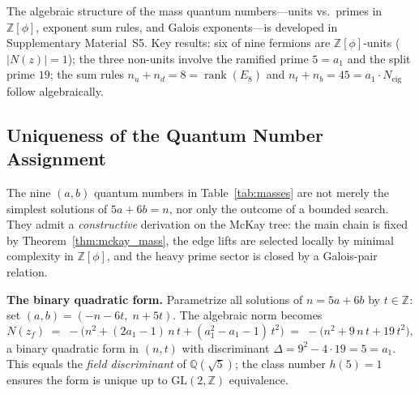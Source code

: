 \documentclass[12pt,a4paper]{article}
\theoremstyle{definition}
\begin{document}
The algebraic structure of the mass quantum numbers---units vs.\ primes in $\mathbb{Z}[\phi]$, exponent sum rules, and Galois exponents---is developed in Supplementary Material~S5.  Key results: six of nine fermions are $\mathbb{Z}[\phi]$-units ($|N(z)| = 1$); the three non-units involve the ramified prime $5 = a_1$ and the split prime $19$; the sum rules $n_u + n_d = 8 = \operatorname{rank}(E_8)$ and $n_t + n_b = 45 = a_1 \cdot N_{\text{eig}}$ follow algebraically.

\subsection{Uniqueness of the Quantum Number Assignment}
\label{sec:uniqueness}

The nine $(a,b)$ quantum numbers in Table~\ref{tab:masses} are not merely the simplest solutions of $5a + 6b = n$, nor only the outcome of a bounded search.  They admit a \emph{constructive} derivation on the McKay tree: the main chain is fixed by Theorem~\ref{thm:mckay_mass}, the edge lifts are selected locally by minimal complexity in $\mathbb{Z}[\phi]$, and the heavy prime sector is closed by a Galois-pair relation.

\smallskip\noindent\textbf{The binary quadratic form.}
Parametrize all solutions of $n = 5a + 6b$ by $t \in \mathbb{Z}$: set $(a,b) = (-n - 6t,\; n + 5t)$.
The algebraic norm becomes
\begin{equation}
N(z_f) \;=\; -\bigl(n^2 + (2a_1 - 1)\,n\,t + (a_1^2 - a_1 - 1)\,t^2\bigr)
\;=\; -\bigl(n^2 + 9\,n\,t + 19\,t^2\bigr),
\label{eq:norm_quadratic}
\end{equation}
a binary quadratic form in $(n,t)$ with discriminant $\Delta = 9^2 - 4 \cdot 19 = 5 = a_1$.
This equals the \emph{field discriminant} of $\mathbb{Q}(\sqrt{5})$; the class number $h(5) = 1$ ensures the form is unique up to $\mathrm{GL}(2,\mathbb{Z})$ equivalence.
\end{document}
